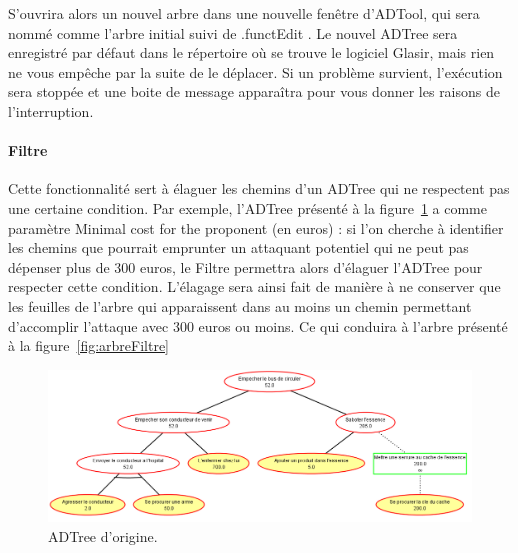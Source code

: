 S'ouvrira alors un nouvel arbre dans une nouvelle fenêtre d'ADTool, qui sera nommé comme l'arbre initial suivi de \og .functEdit \fg{} . Le nouvel ADTree sera enregistré par défaut dans le répertoire où se trouve le logiciel Glasir, mais rien ne vous empêche par la suite de le déplacer. 
Si un problème survient, l'exécution sera stoppée et une boite de message apparaîtra pour vous donner les raisons de l'interruption.

\paragraph{Filtre} Cette fonctionnalité sert à élaguer les chemins d'un ADTree qui ne respectent pas une certaine condition. Par exemple, l'ADTree présenté à la {\sc figure}~\ref{fig:arbreOrigine} a comme paramètre \og Minimal cost for the proponent \fg (en euros) : si l'on cherche à identifier les chemins que pourrait emprunter un attaquant potentiel qui ne peut pas dépenser plus de 300 euros, le Filtre permettra alors d'élaguer l'ADTree pour respecter cette condition. L'élagage sera ainsi fait de manière à ne conserver que les feuilles de l'arbre qui apparaissent dans au moins un chemin permettant d'accomplir l'attaque avec 300 euros ou moins. Ce qui conduira à l'arbre présenté à la {\sc figure}~\ref{fig:arbreFiltre}

 \begin{figure}[H]
        \centering
        \hspace*{-2.8cm}
        \includegraphics[height=0.5\textwidth]{figure/arbreOrigine.png}
        \caption{ADTree d'origine.}
        \label{fig:arbreOrigine}
    \end{figure}

